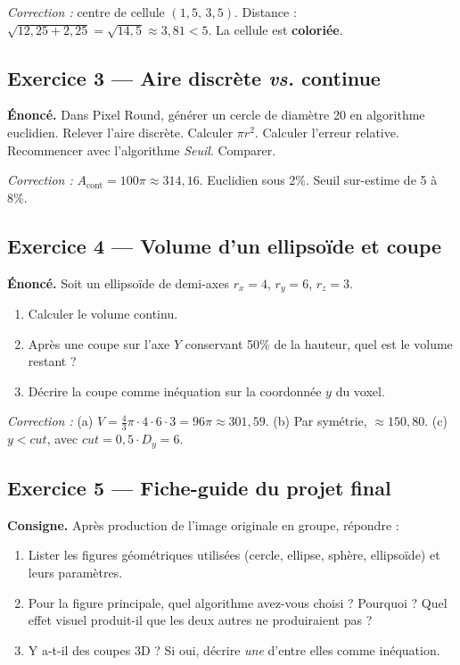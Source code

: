 \documentclass[12pt,a4paper]{scrartcl}
\newcommand{\acc}[1]{\textcolor{accent}{\textbf{#1}}}
\begin{document}
\emph{Correction :} centre de cellule $(1{,}5,\, 3{,}5)$. Distance : $\sqrt{12{,}25 + 2{,}25} = \sqrt{14{,}5} \approx 3{,}81 < 5$. La cellule est \acc{coloriée}.

\subsection*{Exercice 3 --- Aire discrète \emph{vs.} continue}
\textbf{Énoncé.} Dans Pixel Round, générer un cercle de diamètre 20 en algorithme euclidien. Relever l'aire discrète. Calculer $\pi r^2$. Calculer l'erreur relative. Recommencer avec l'algorithme \emph{Seuil}. Comparer.

\emph{Correction :} $A_{\text{cont}} = 100\pi \approx 314{,}16$. Euclidien sous 2\%. Seuil sur-estime de 5 à 8\%.

\subsection*{Exercice 4 --- Volume d'un ellipsoïde et coupe}
\textbf{Énoncé.} Soit un ellipsoïde de demi-axes $r_x = 4$, $r_y = 6$, $r_z = 3$.
\begin{enumerate}[label=\alph*),leftmargin=1.5em,itemsep=0.1em,topsep=0.2em,nosep]
  \item Calculer le volume continu.
  \item Après une coupe sur l'axe $Y$ conservant 50\% de la hauteur, quel est le volume restant ?
  \item Décrire la coupe comme inéquation sur la coordonnée $y$ du voxel.
\end{enumerate}

\emph{Correction :}
(a) $V = \tfrac{4}{3}\pi \cdot 4 \cdot 6 \cdot 3 = 96\pi \approx 301{,}59$.
(b) Par symétrie, $\approx 150{,}80$.
(c) $y < \mathit{cut}$, avec $\mathit{cut} = 0{,}5 \cdot D_y = 6$.

\subsection*{Exercice 5 --- Fiche-guide du projet final}
\textbf{Consigne.} Après production de l'image originale en groupe, répondre :
\begin{enumerate}[label=(\arabic*),leftmargin=1.7em,itemsep=0.15em,topsep=0.2em,nosep]
  \item Lister les figures géométriques utilisées (cercle, ellipse, sphère, ellipsoïde) et leurs paramètres.
  \item Pour la figure principale, quel algorithme avez-vous choisi ? Pourquoi ? Quel effet visuel produit-il que les deux autres ne produiraient pas ?
  \item Y a-t-il des coupes 3D ? Si oui, décrire \emph{une} d'entre elles comme inéquation.
\end{enumerate}
\end{document}
